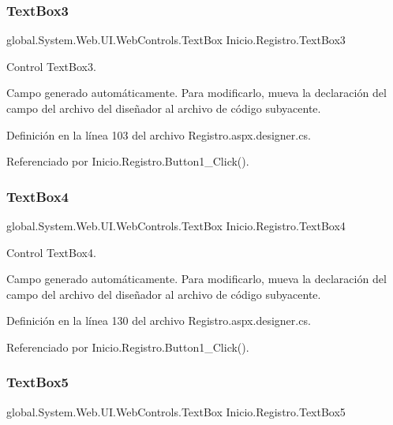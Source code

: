 \subsubsection{\texorpdfstring{TextBox3}{TextBox3}}
{\footnotesize\ttfamily global.\+System.\+Web.\+U\+I.\+Web\+Controls.\+Text\+Box Inicio.\+Registro.\+Text\+Box3\hspace{0.3cm}{\ttfamily [protected]}}



Control Text\+Box3. 

Campo generado automáticamente. Para modificarlo, mueva la declaración del campo del archivo del diseñador al archivo de código subyacente. 

Definición en la línea 103 del archivo Registro.\+aspx.\+designer.\+cs.



Referenciado por Inicio.\+Registro.\+Button1\+\_\+\+Click().

\mbox{\label{classInicio_1_1Registro_a835108d17c8690d089f9ee129b2ff7f3}} 
\subsubsection{\texorpdfstring{TextBox4}{TextBox4}}
{\footnotesize\ttfamily global.\+System.\+Web.\+U\+I.\+Web\+Controls.\+Text\+Box Inicio.\+Registro.\+Text\+Box4\hspace{0.3cm}{\ttfamily [protected]}}



Control Text\+Box4. 

Campo generado automáticamente. Para modificarlo, mueva la declaración del campo del archivo del diseñador al archivo de código subyacente. 

Definición en la línea 130 del archivo Registro.\+aspx.\+designer.\+cs.



Referenciado por Inicio.\+Registro.\+Button1\+\_\+\+Click().

\mbox{\label{classInicio_1_1Registro_a9bc70ac4aacbc0573d097586b9663f28}} 
\subsubsection{\texorpdfstring{TextBox5}{TextBox5}}
{\footnotesize\ttfamily global.\+System.\+Web.\+U\+I.\+Web\+Controls.\+Text\+Box Inicio.\+Registro.\+Text\+Box5\hspace{0.3cm}{\ttfamily [protected]}}



